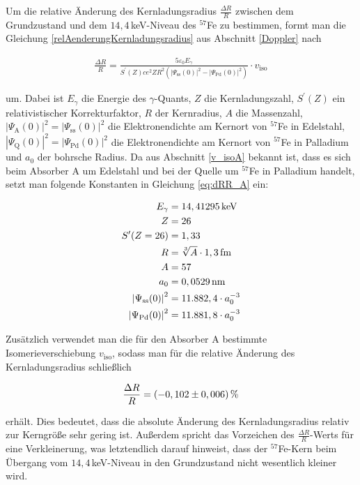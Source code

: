 \documentclass[
a4paper,                %
titlepage=firstiscover, %
captions=tableheading,  %
toc=bibliography,       %
toc=listof,             %
oneside,                %
automark,               %
12pt,                   %
english, ngerman,       %
parskip = half,         %
]{scrartcl}
\begin{document}
Um die relative Änderung des Kernladungsradius $\frac{\Delta R}{R}$ zwischen dem Grundzustand und dem $14,4\,$keV-Niveau des $^{57}$Fe zu bestimmen, formt man die Gleichung \ref{relAenderungKernladungsradius} aus Abschnitt \ref{Doppler} nach

\begin{align} \label{eq:dRR_A}
\frac{\Delta R}{R}=\frac{5\varepsilon_{0}E_{\gamma}}{S^{\prime}(Z)ce^{2}ZR^2\left( \left| \Psi_\text{ss}(0)\right|^2 - \left| \Psi_\text{Pd}(0)\right|^2\right)}\cdot v_\text{iso}
\end{align}

\noindent um.
Dabei ist $E_{\gamma}$ die Energie des $\gamma$-Quants, $Z$ die Kernladungszahl, $S^{\prime}(Z)$ ein relativistischer Korrekturfaktor, $R$ der Kernradius, $A$ die Massenzahl, $\left| \Psi_\text{A}(0)\right|^2 = \left| \Psi_\text{ss}(0)\right|^2$ die Elektronendichte am Kernort von $^{57}$Fe in Edelstahl, $\left| \Psi_\text{Q}(0)\right|^2 = \left| \Psi_\text{Pd}(0)\right|^2$ die Elektronendichte am Kernort von $^{57}$Fe in Palladium und $a_{0}$ der bohrsche Radius.
Da aus Abschnitt \ref{v_isoA} bekannt ist, dass es sich beim Absorber A um Edelstahl und bei der Quelle um $^{57}$Fe in Palladium handelt, setzt man folgende Konstanten in Gleichung \ref{eq:dRR_A} ein:

\begin{align*}
E_{\gamma} &= 14,41295\,\textnormal{keV} \\
Z &= 26 \\
S^{\prime}(Z=26) &= 1,33 \\
R &= \sqrt[3]{A}\cdot 1,3\,\textnormal{fm} \\
A &= 57 \\
a_{0} &= 0,0529\,\textnormal{nm} \\
\left| \Psi_\text{ss}(0)\right|^2 &= 11.882,4\cdot a_{0}^{-3} \\
\left| \Psi_\text{Pd}(0)\right|^2 &= 11.881,8\cdot a_{0}^{-3}
\end{align*}

\noindent Zusätzlich verwendet man die für den Absorber A bestimmte Isomerieverschiebung $v_\text{iso}$, sodass man für die relative Änderung des Kernladungsradius schließlich

\begin{align*}
\frac{\Delta R}{R}=(-0,102\pm 0,006)\,\textnormal{\%}
\end{align*}

\noindent erhält.
Dies bedeutet, dass die absolute Änderung des Kernladungsradius relativ zur Kerngröße sehr gering ist.
Außerdem spricht das Vorzeichen des $\frac{\Delta R}{R}$-Werts für eine Verkleinerung, was letztendlich darauf hinweist, dass der $^{57}$Fe-Kern beim Übergang vom $14,4\,$keV-Niveau in den Grundzustand nicht wesentlich kleiner wird.
\end{document}
